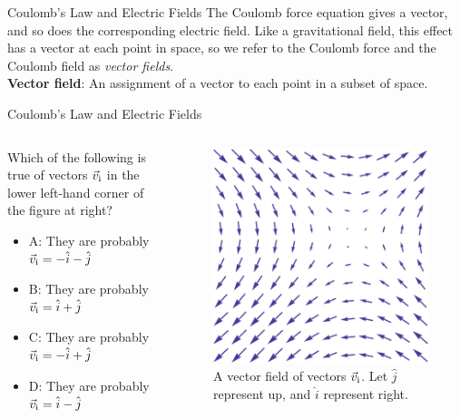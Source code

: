 \documentclass{beamer}
\begin{document}
\begin{frame}{Coulomb’s Law and Electric Fields}
\small
The Coulomb force equation gives a vector, and so does the corresponding electric field.  Like a gravitational field, this effect has a vector at each point in space, so we refer to the Coulomb force and the Coulomb field as \textit{vector fields}. \\ \vspace{0.5cm}
\textbf{Vector field}: An assignment of a vector to each point in a subset of space.
\end{frame}

\begin{frame}{Coulomb’s Law and Electric Fields}
\small
\begin{columns}[T]
\begin{column}{0.5\textwidth}
Which of the following is true of vectors $\vec{v}_{\rm i}$ in the lower left-hand corner of the figure at right?
\begin{itemize}
\item A: They are probably $\vec{v}_{\rm i} = -\hat{i}-\hat{j}$
\item B: They are probably $\vec{v}_{\rm i} = \hat{i}+\hat{j}$
\item C: They are probably $\vec{v}_{\rm i} = -\hat{i}+\hat{j}$
\item D: They are probably $\vec{v}_{\rm i} = \hat{i}-\hat{j}$
\end{itemize}
\end{column}
\begin{column}{0.5\textwidth}
\begin{figure}
\includegraphics[width=\textwidth]{figures/vectorField.png}
\caption{\label{fig:field} A vector field of vectors $\vec{v}_{\rm i}$.  Let $\hat{j}$ represent up, and $\hat{i}$ represent right.}
\end{figure}
\end{column}
\end{columns}
\end{frame}
\end{document}
